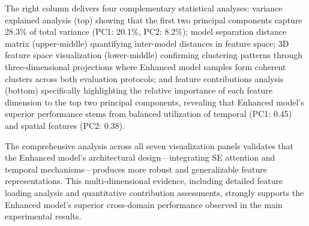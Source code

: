\documentclass[journal]{IEEEtran}
\begin{document}
The right column delivers four complementary statistical analyses: variance explained analysis (top) showing that the first two principal components capture 28.3\% of total variance (PC1: 20.1\%, PC2: 8.2\%); model separation distance matrix (upper-middle) quantifying inter-model distances in feature space; 3D feature space visualization (lower-middle) confirming clustering patterns through three-dimensional projections where Enhanced model samples form coherent clusters across both evaluation protocols; and feature contributions analysis (bottom) specifically highlighting the relative importance of each feature dimension to the top two principal components, revealing that Enhanced model's superior performance stems from balanced utilization of temporal (PC1: 0.45) and spatial features (PC2: 0.38).

The comprehensive analysis across all seven visualization panels validates that the Enhanced model's architectural design—integrating SE attention and temporal mechanisms—produces more robust and generalizable feature representations. This multi-dimensional evidence, including detailed feature loading analysis and quantitative contribution assessments, strongly supports the Enhanced model's superior cross-domain performance observed in the main experimental results.
\end{document}
